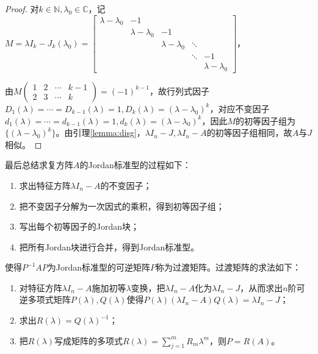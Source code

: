         \begin{proof}
            对$k\in\mathbb{N},\lambda_0\in\mathbb{C}$，记$M=\lambda I_k-J_k(\lambda_0)=\begin{bmatrix}\lambda-\lambda_0&-1\\&\lambda-\lambda_0&-1\\&&\lambda-\lambda_0&\ddots\\&&&\ddots&-1\\&&&&\lambda-\lambda_0\end{bmatrix}$，

            由$M\begin{pmatrix}1&2&\cdots&k-1\\2&3&\cdots&k\end{pmatrix}=(-1)^{k-1}$，故行列式因子$D_1(\lambda)=\cdots=D_{k-1}(\lambda)=1,D_k(\lambda)=(\lambda-\lambda_0)^k$，对应不变因子$d_1(\lambda)=\cdots=d_{k-1}(\lambda)=1,d_k(\lambda)=(\lambda-\lambda_0)^k$，因此$M$的初等因子组为$\{(\lambda-\lambda_0)^k\}$。由引理\ref{lemma:disg}，$\lambda I_n-J,\lambda I_n-A$的初等因子组相同，故$A$与$J$相似。
        \end{proof}

        最后总结求复方阵$A$的Jordan标准型的过程如下：

        \begin{enumerate}
            \item 求出特征方阵$\lambda I_n-A$的不变因子；
            \item 把不变因子分解为一次因式的乘积，得到初等因子组；
            \item 写出每个初等因子的Jordan块；
            \item 把所有Jordan块进行合并，得到Jordan标准型。
        \end{enumerate}

        使得$P^{-1}AP$为Jordan标准型的可逆矩阵$P$称为过渡矩阵。过渡矩阵的求法如下：

        \begin{enumerate}
            \item 对特征方阵$\lambda I_n-A$施加初等$\lambda$变换，把$\lambda I_n-A$化为$\lambda I_n-J$，从而求出$n$阶可逆多项式矩阵$P(\lambda),Q(\lambda)$使得$P(\lambda)(\lambda I_n-A)Q(\lambda)=\lambda I_n-J$；
            \item 求出$R(\lambda)=Q(\lambda)^{-1}$；
            \item 把$R(\lambda)$写成矩阵的多项式$R(\lambda)=\sum\limits_{j=1}^m R_m \lambda^m$，则$P=R(A)$。
        \end{enumerate}

